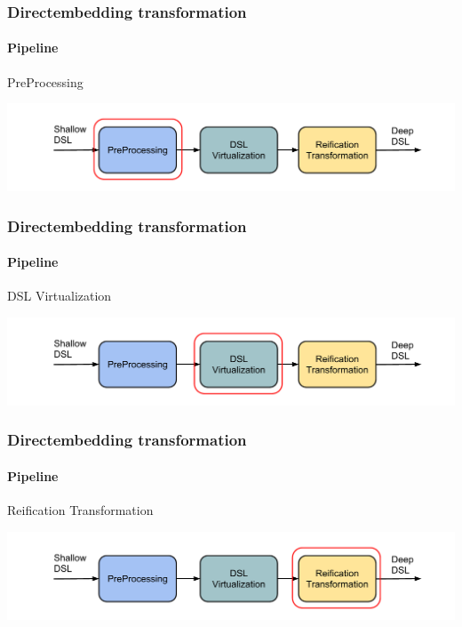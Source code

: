 \documentclass[xcolor=dvipsnames]{beamer}
\theoremstyle{definition}
\begin{document}
\begin{frame}[fragile]
    \frametitle{Directembedding transformation}
    \framesubtitle{Pipeline}
    \begin{block}{PreProcessing}
        
    \end{block}
    \begin{center}
        \includegraphics[width=\textwidth]{img/pipeline2.pdf}
    \end{center}
\end{frame}


\begin{frame}[fragile]
    \frametitle{Directembedding transformation}
    \framesubtitle{Pipeline}
    \begin{block}{DSL Virtualization}
        
    \end{block}
    \begin{center}
        \vspace{-0.5cm}
        \includegraphics[width=\textwidth]{img/pipeline3.pdf}
    \end{center}
\end{frame}

\begin{frame}[fragile]
    \frametitle{Directembedding transformation}
    \framesubtitle{Pipeline}
    \begin{block}{Reification Transformation}
        
    \end{block}
    \begin{center}
        \vspace{-0.5cm}
        \includegraphics[width=\textwidth]{img/pipeline4.pdf}
    \end{center}
\end{frame}
\end{document}
